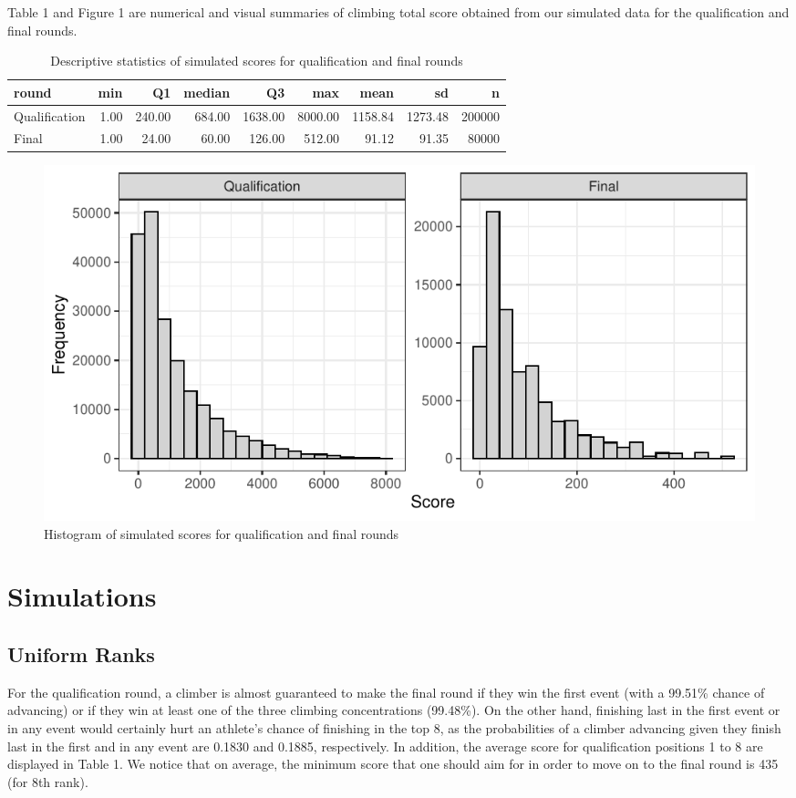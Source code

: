 \documentclass[12pt]{article}
\begin{document}
Table 1 and Figure 1 are numerical and visual summaries of climbing
total score obtained from our simulated data for the qualification and
final rounds.

\begin{table}[ht]
\centering
\caption{Descriptive statistics of simulated scores for qualification and final rounds} 
\begin{tabular}{lrrrrrrrr}
  \hline
round & min & Q1 & median & Q3 & max & mean & sd & n \\ 
  \hline
Qualification & 1.00 & 240.00 & 684.00 & 1638.00 & 8000.00 & 1158.84 & 1273.48 & 200000 \\ 
  Final & 1.00 & 24.00 & 60.00 & 126.00 & 512.00 & 91.12 & 91.35 & 80000 \\ 
   \hline
\end{tabular}
\end{table}

\begin{figure}[H]
\centering
\includegraphics{draft_files/figure-latex/unnamed-chunk-5-1.pdf}
\caption{Histogram of simulated scores for qualification and final
rounds}
\end{figure}

\hypertarget{simulations}{%
\section{Simulations}\label{simulations}}

\hypertarget{uniform-ranks}{%
\subsection{Uniform Ranks}\label{uniform-ranks}}

For the qualification round, a climber is almost guaranteed to make the
final round if they win the first event (with a 99.51\% chance of
advancing) or if they win at least one of the three climbing
concentrations (99.48\%). On the other hand, finishing last in the first
event or in any event would certainly hurt an athlete's chance of
finishing in the top 8, as the probabilities of a climber advancing
given they finish last in the first and in any event are 0.1830 and
0.1885, respectively. In addition, the average score for qualification
positions 1 to 8 are displayed in Table 1. We notice that on average,
the minimum score that one should aim for in order to move on to the
final round is 435 (for 8th rank).
\end{document}

